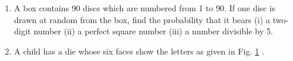 \begin{enumerate}[label=\thesection.\arabic*.,ref=\thesection.\theenumi]
(i) What is the probability that the card is the queen?\\
(ii) If the queen is drawn and put aside, what is the probability that the second card
picked up is (a) an ace? (b) a queen?
\\
\solution

\item A box contains 90 discs which are numbered from 1 to 90. If one disc is drawn at random
from the box, find the probability that it bears (i) a two-digit number (ii) a perfect
square number (iii) a number divisible by 5.
\\
\solution

\item A child has a die whose six faces show the letters as given in Fig. \ref{fig:130_dice}	.

\begin{figure}[!ht]
\centering
\resizebox{\columnwidth}{!}{}
\caption{}
\label{fig:130_dice}	
\end{figure}


\end{enumerate}
